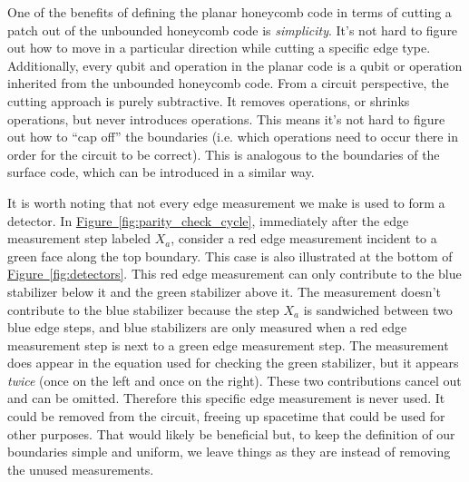 \documentclass[onecolumn,unpublished,a4paper]{quantumarticle}
\theoremstyle{definition}
\theoremstyle{definition}
\theoremstyle{definition}
\newcommand{\fig}[1]{\hyperref[fig:#1]{Figure~\ref*{fig:#1}}}
\begin{document}
One of the benefits of defining the planar honeycomb code in terms of cutting a patch out of the unbounded honeycomb code is \emph{simplicity}.  
It's not hard to figure out how to move in a particular direction while cutting a specific edge type.
Additionally, every qubit and operation in the planar code is a qubit or operation inherited from the unbounded honeycomb code.
From a circuit perspective, the cutting approach is purely subtractive.
It removes operations, or shrinks operations, but never introduces operations.
This means it's not hard to figure out how to ``cap off'' the boundaries (i.e. which operations need to occur there in order for the circuit to be correct).
This is analogous to the boundaries of the surface code, which can be introduced in a similar way.

It is worth noting that not every edge measurement we make is used to form a detector.  
In \fig{parity_check_cycle}, immediately after the edge measurement step labeled $X_a$, consider a red edge measurement incident to a green face along the top boundary. This case is also illustrated at the bottom of \fig{detectors}.
This red edge measurement can only contribute to the blue stabilizer below it and the green stabilizer above it.
The measurement doesn't contribute to the blue stabilizer because the step $X_a$ is sandwiched between two blue edge steps, and blue stabilizers are only measured when a red edge measurement step is next to a green edge measurement step.
The measurement does appear in the equation used for checking the green stabilizer, but it appears \emph{twice} (once on the left and once on the right).
These two contributions cancel out and can be omitted.
Therefore this specific edge measurement is never used.
It could be removed from the circuit, freeing up spacetime that could be used for other purposes.
That would likely be beneficial but, to keep the definition of our boundaries simple and uniform, we leave things as they are instead of removing the unused measurements.
\end{document}

